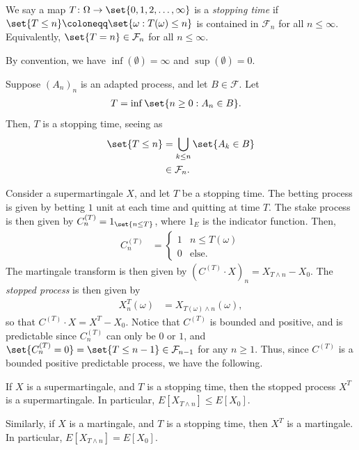 \documentclass[10pt]{mypackage}
\renewcommand{\coloneq}{\coloneqq}
\begin{document}
\begin{definition}
  We say a map $T\colon \Omega\to \set{0,1,2,\dots,\infty}$ is a \textit{stopping time} if $\set{T\leq n}\coloneq \set{\omega : T(\omega)\leq n}$ is contained in $\mathcal{F}_n$ for all $n\leq \infty$. Equivalently, $\set{T = n} \in \mathcal{F}_n$ for all $n\leq \infty$. 
\end{definition}
By convention, we have $\inf\left( \emptyset \right) = \infty$ and $\sup\left( \emptyset \right) = 0$.
\begin{example}
  Suppose $\left( A_n \right)_n$ is an adapted process, and let $B\in \mathcal{F}$. Let
  \begin{align*}
    T &= \inf\set{n\geq 0 : A_n\in B}.
  \end{align*}
  Then, $T$ is a stopping time, seeing as
  \begin{align*}
    \set{T\leq n} &= \bigcup_{k\leq n} \set{A_k\in B}\\
                  &\in \mathcal{F}_n.
  \end{align*}
\end{example}
Consider a supermartingale $X$, and let $T$ be a stopping time. The betting process is given by betting $1$ unit at each time and quitting at time $T$. The stake process is then given by $C^{(T)}_{n} = 1_{\set{n\leq T}}$, where $1_E$ is the indicator function. Then,
\begin{align*}
  C^{(T)}_{n} &= \begin{cases}
    1 & n\leq T(\omega)\\
    0 & \text{else}.
  \end{cases}
\end{align*}
The martingale transform is then given by $\left( C^{(T)}\cdot X \right)_{n} = X_{T\wedge n}-X_0$. The \textit{stopped process} is then given by 
\begin{align*}
  X^T_{n}(\omega) &= X_{T(\omega)\wedge n}(\omega),
\end{align*}
so that $C^{(T)}\cdot X = X^{T}-X_0$. Notice that $C^{(T)}$ is bounded and positive, and is predictable since $C^{(T)}_{n}$ can only be $0$ or $1$, and $\set{C^{(T)}_{n} = 0} = \set{T\leq n-1}\in \mathcal{F}_{n-1}$ for any $n\geq 1$. Thus, since $C^{(T)}$ is a bounded positive predictable process, we have the following.
\begin{theorem}
  If $X$ is a supermartingale, and $T$ is a stopping time, then the stopped process $X^{T}$ is a supermartingale. In particular, $E\left[ X_{T\wedge n} \right]\leq E\left[ X_0 \right]$.

  Similarly, if $X$ is a martingale, and $T$ is a stopping time, then $X^{T}$ is a martingale. In particular, $E\left[ X_{T\wedge n} \right] = E\left[ X_0 \right]$.
\end{theorem}
\end{document}
